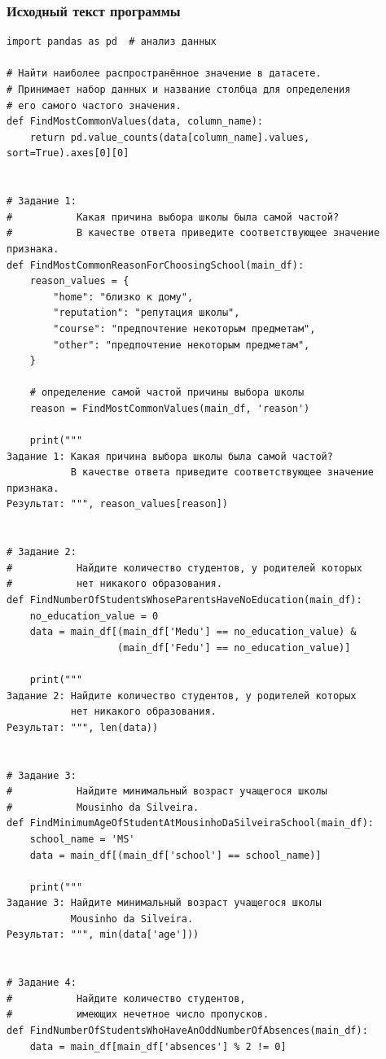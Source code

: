 \documentclass[a4paper]{article}
\begin{document}
\subsubsection{Исходный текст программы}
\normalsize{
    \begin{verbatim}
import pandas as pd  # анализ данных

# Найти наиболее распространённое значение в датасете.
# Принимает набор данных и название столбца для определения 
# его самого частого значения.
def FindMostCommonValues(data, column_name):
    return pd.value_counts(data[column_name].values, sort=True).axes[0][0]


# Задание 1:
#           Какая причина выбора школы была самой частой?
#           В качестве ответа приведите соответствующее значение признака.
def FindMostCommonReasonForChoosingSchool(main_df):
    reason_values = {
        "home": "близко к дому",
        "reputation": "репутация школы",
        "course": "предпочтение некоторым предметам",
        "other": "предпочтение некоторым предметам",
    }

    # определение самой частой причины выбора школы
    reason = FindMostCommonValues(main_df, 'reason')

    print("""
Задание 1: Какая причина выбора школы была самой частой?
           В качестве ответа приведите соответствующее значение признака.
Результат: """, reason_values[reason])


# Задание 2:
#           Найдите количество студентов, у родителей которых 
#           нет никакого образования.
def FindNumberOfStudentsWhoseParentsHaveNoEducation(main_df):
    no_education_value = 0
    data = main_df[(main_df['Medu'] == no_education_value) &
                   (main_df['Fedu'] == no_education_value)]

    print("""
Задание 2: Найдите количество студентов, у родителей которых
           нет никакого образования.
Результат: """, len(data))


# Задание 3:
#           Найдите минимальный возраст учащегося школы 
#           Mousinho da Silveira.
def FindMinimumAgeOfStudentAtMousinhoDaSilveiraSchool(main_df):
    school_name = 'MS'
    data = main_df[(main_df['school'] == school_name)]

    print("""
Задание 3: Найдите минимальный возраст учащегося школы 
           Mousinho da Silveira.
Результат: """, min(data['age']))


# Задание 4:
#           Найдите количество студентов, 
#           имеющих нечетное число пропусков.
def FindNumberOfStudentsWhoHaveAnOddNumberOfAbsences(main_df):
    data = main_df[main_df['absences'] % 2 != 0]


\end{verbatim}}
\end{document}
